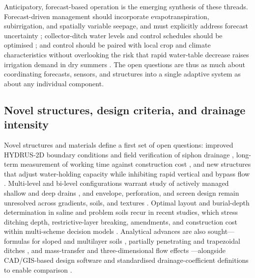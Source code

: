 \documentclass[11pt]{article}
\begin{document}
Anticipatory, forecast-based operation is the emerging synthesis of these
threads. Forecast-driven management should incorporate evapotranspiration,
subirrigation, and spatially variable seepage, and must explicitly address
forecast uncertainty \parencite{VandeCraats2021}; collector-ditch water levels
and control schedules should be optimised \parencite{Salla2022,Strock2025b};
and control should be paired with local crop and climate characteristics
without overlooking the risk that rapid water-table decrease raises irrigation
demand in dry summers
\parencite{Güngör2023,Dou2023,Golmohammadi2016,Kim2023,Wang2020c}. The open
questions are thus as much about coordinating forecasts, sensors, and structures
into a single adaptive system as about any individual component.

\subsection{Novel structures, design criteria, and drainage intensity}

Novel structures and materials define a first set of open questions: improved
HYDRUS-2D boundary conditions and field verification of siphon drainage
\parencite{Ren2023}, long-term measurement of working time against construction
cost \parencite{Tao2025b}, and new structures that adjust water-holding capacity
while inhibiting rapid vertical and bypass flow \parencite{Li2021}. Multi-level
and bi-level configurations warrant study of actively managed shallow and deep
drains \parencite{Hornbuckle2007,Verma1998,Nelson2011b}, and envelope,
perforation, and screen design remain unresolved across gradients, soils, and
textures \parencite{Alavi2021,Wu2022,Oyarce2017,HajAmor2019}. Optimal layout and
burial-depth determination in saline and problem soils recur in recent studies,
which stress ditching depth, restrictive-layer breaking, amendments, and
construction cost within multi-scheme decision models
\parencite{Tian2023,Tian2024,Tian2023c,Zhang2024d,Zhai2023,Han2023,Qian2025b,Ren2021,Zheng2025,SerranoCoronel2018,Zegeye2021}.
Analytical advances are also sought---formulas for sloped and multilayer soils
\parencite{Tao2016,Tao2019}, partially penetrating and trapezoidal ditches
\parencite{Chahar2010,Afruzi2014}, and mass-transfer and three-dimensional flow
effects \parencite{Zhang2024}---alongside CAD/GIS-based design software and
standardised drainage-coefficient definitions to enable comparison
\parencite{GALLICHAND1992b,Skaggs2017}.
\end{document}
